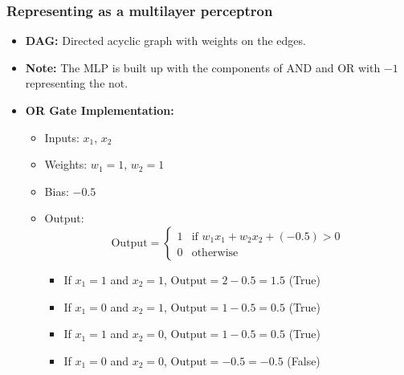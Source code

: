 \subsubsection{Representing as a multilayer perceptron}
\begin{definition}
    \begin{itemize}
        \item \textbf{DAG:} Directed acyclic graph with weights on the edges. 
        \item \textbf{Note:} The MLP is built up with the components of AND and OR with $-1$ representing the not. 
    \end{itemize}
    \begin{itemize}
        \item \textbf{OR Gate Implementation:}
        \begin{itemize}
            \item Inputs: \( x_1 \), \( x_2 \)
            \item Weights: \( w_1 = 1 \), \( w_2 = 1 \)
            \item Bias: \( -0.5 \)
            \item Output: 
            \[
            \text{Output} = 
            \begin{cases}
            1 & \text{if } w_1 x_1 + w_2 x_2 + (-0.5) > 0 \\
            0 & \text{otherwise}
            \end{cases}
            \]
            \begin{itemize}
                \item If $x_1 = 1$ and $x_2 = 1$, $\text{Output} = 2 - 0.5 = 1.5$ (True)
                \item If $x_1 = 0$ and $x_2 = 1$, $\text{Output} = 1 - 0.5 = 0.5$ (True)
                \item If $x_1 = 1$ and $x_2 = 0$, $\text{Output} = 1 - 0.5 = 0.5$ (True)
                \item If $x_1 = 0$ and $x_2 = 0$, $\text{Output} = - 0.5 = -0.5$ (False)
            \end{itemize}
        \end{itemize}
        

\end{itemize}
\end{definition}

